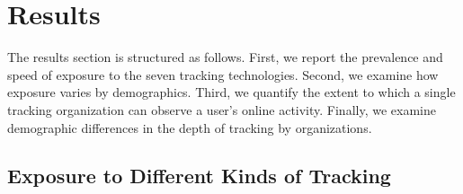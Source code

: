 \documentclass[12pt, letterpaper]{article}
\begin{document}
\section{Results}
\label{sec:results}

The results section is structured as follows. First, we report the prevalence and speed of exposure to the seven tracking technologies. Second, we examine how exposure varies by demographics. Third, we quantify the extent to which a single tracking organization can observe a user's online activity. Finally, we examine demographic differences in the depth of tracking by organizations.

\subsection{Exposure to Different Kinds of Tracking}
\label{sec:prevalence_tracking}
\end{document}
